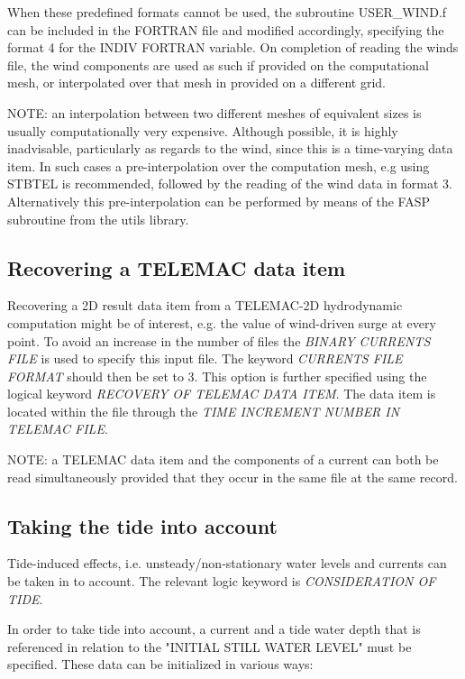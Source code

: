  When these predefined formats cannot be used, the subroutine USER\_WIND.f can be included in the FORTRAN file and modified accordingly, specifying the format 4 for the INDIV FORTRAN variable. On completion of reading the winds file, the wind components are used as such if provided on the computational mesh, or interpolated over that mesh in provided on a different grid.

 NOTE: an interpolation between two different meshes of equivalent sizes is usually computationally very expensive. Although possible, it is highly inadvisable, particularly as regards to the wind, since this is a time-varying data item. In such cases a pre-interpolation over the computation mesh, e.g using STBTEL is recommended, followed by the reading of the wind data in format 3. Alternatively this pre-interpolation can be performed by means of the FASP subroutine from the utils library.


\subsection{ Recovering a TELEMAC data item}
\label{se:telemacdata}
 Recovering a 2D result data item from a TELEMAC-2D hydrodynamic computation might be of interest, e.g. the value of wind-driven surge at every point. To avoid an increase in the number of files the \textit{BINARY CURRENTS FILE} is used to specify this input file. The keyword \textit{CURRENTS FILE FORMAT} should then be set to 3. This option is further specified using the logical keyword \textit{RECOVERY OF TELEMAC DATA ITEM}. The data item is located within the file through the \textit{TIME INCREMENT NUMBER IN TELEMAC FILE}.

 NOTE: a TELEMAC data item and the components of a current can both be read simultaneously provided that they occur in the same file at the same record.



\subsection{ Taking the tide into account}
\label{se:tide}
 Tide-induced effects, i.e. unsteady/non-stationary water levels and currents can be taken in to account. The relevant logic keyword is \textit{CONSIDERATION OF TIDE}.

 In order to take tide into account, a current and a tide water depth that is referenced in relation to the "INITIAL STILL WATER LEVEL" must be specified. These data can be initialized in various ways:

